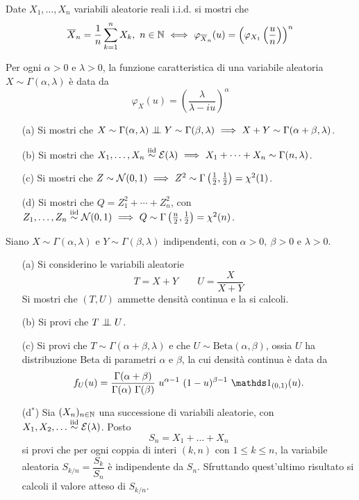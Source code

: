 \Esercizio{} %
Date $X_1,\dots,X_n$ variabili aleatorie reali i.i.d. si mostri che
\[
\overline{X}_n=\displaystyle\frac{1}{n}\sum_{k=1}^n X_k,\ n\in\mathbb{N}\ \Longleftrightarrow\  \varphi_{\overline{X}_n}(u)=\left(\varphi_{X_1}\left(\frac{u}{n}\right)\right)^n
\]

\Esercizio{} %
Per ogni $\alpha>0$ e $\lambda>0$, la funzione caratteristica di una variabile aleatoria $X\sim\Gamma(\alpha,\lambda)$ è data da
\[
\varphi_X(u)=\left( \frac{\lambda}{\lambda-iu} \right)^\alpha
\]
\begin{enumerate}
\item [(a)] Si mostri che $X\sim\Gamma(\alpha,\lambda)\indep Y\sim\Gamma(\beta,\lambda)\SE X+Y\sim\Gamma(\alpha+\beta,\lambda)$.
\item [(b)] Si mostri che $X_1,\dots,X_n\stackrel{\mathrm{iid}}{\sim}\mathcal{E}(\lambda)\ \Longrightarrow\  X_1+\cdots+X_n\sim\Gamma(n,\lambda)$.
\item [(c)] Si mostri che $Z\sim\mathcal{N}(0,1)\ \Longrightarrow\  Z^2\sim\Gamma\left(\frac{1}{2},\frac{1}{2}\right)=\chi^2(1)$.
\item [(d)] Si mostri che $Q=Z_1^2+\cdots+Z_n^2$, con $Z_1,\dots,Z_n\stackrel{\mathrm{iid}}{\sim}\mathcal{N}(0,1)\ \Longrightarrow\  Q\sim\Gamma\left(\frac{n}{2},\frac{1}{2}\right)=\chi^2(n)$.
\end{enumerate}

\Esercizio{} %
Siano $X\sim\Gamma(\alpha,\lambda)$ e $Y\sim\Gamma(\beta,\lambda)$ indipendenti, con $\alpha>0,\ \beta>0$ e $\lambda>0$.
\begin{enumerate}
\item [(a)] Si considerino le variabili aleatorie
\[
T=X+Y\qquad U=\frac{X}{X+Y}
\]
Si mostri che $(T,U)$ ammette densità continua e la si calcoli.
\item [(b)] Si provi che $T\indep U$.
\item [(c)] Si provi che $T\sim\Gamma(\alpha+\beta,\lambda)$ e che $U\sim\text{Beta}(\alpha,\beta)$, ossia $U$ ha distribuzione Beta di parametri $\alpha$ e $\beta$, la cui densità continua è data da
\[
f_U(u)=\frac{\Gamma(\alpha+\beta)}{\Gamma(\alpha)\ \Gamma(\beta)}\ u^{\alpha-1}\ (1-u)^{\beta-1}\ \Ind_{(0,1)}(u).
\]
\item [(d$^\ast$)] Sia $(X_n)_{n\in\mathbb{N}}$ una successione di variabili aleatorie, con $X_1,X_2,\dots\stackrel{\mathrm{iid}}{\sim}\mathcal{E}(\lambda)$. Posto
\[
S_n=X_1+\dots+X_n
\]
si provi che per ogni coppia di interi $(k,n)$ con $1\leq k\leq n$, la variabile aleatoria $S_{k/n}=\dfrac{S_k}{S_n}$ è indipendente da $S_n$. Sfruttando quest'ultimo risultato si calcoli il valore atteso di $S_{k/n}$.
\end{enumerate}

